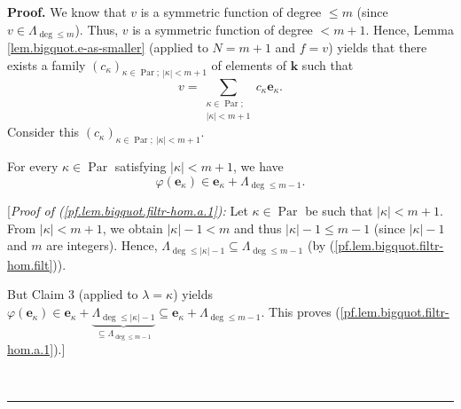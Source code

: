 \documentclass[numbers=enddot,12pt,final,onecolumn,notitlepage]{scrartcl}%
\theoremstyle{definition}
\newenvironment{proof}[1][Proof]{\noindent\textbf{#1.} }{\ \rule{0.5em}{0.5em}}
\let\sumnonlimits\sum
\renewcommand{\sum}{\sumnonlimits\limits}
\begin{document}
\begin{proof}
We know that $v$ is a symmetric function of degree $\leq m$ (since
$v\in\Lambda_{\deg\leq m}$). Thus, $v$ is a symmetric function of degree
$<m+1$. Hence, Lemma \ref{lem.bigquot.e-as-smaller} (applied to $N=m+1$ and
$f=v$) yields that there exists a family $\left(  c_{\kappa}\right)
_{\kappa\in\operatorname*{Par};\ \left\vert \kappa\right\vert <m+1}$ of
elements of $\mathbf{k}$ such that
\begin{equation}
v=\sum_{\substack{\kappa\in\operatorname*{Par};\\\left\vert \kappa\right\vert
<m+1}}c_{\kappa}\mathbf{e}_{\kappa}. \label{pf.lem.bigquot.filtr-hom.a.v=sum}%
\end{equation}
Consider this $\left(  c_{\kappa}\right)  _{\kappa\in\operatorname*{Par}%
;\ \left\vert \kappa\right\vert <m+1}$.

For every $\kappa\in\operatorname*{Par}$ satisfying $\left\vert \kappa
\right\vert <m+1$, we have%
\begin{equation}
\varphi\left(  \mathbf{e}_{\kappa}\right)  \in\mathbf{e}_{\kappa}%
+\Lambda_{\deg\leq m-1}. \label{pf.lem.bigquot.filtr-hom.a.1}%
\end{equation}


[\textit{Proof of (\ref{pf.lem.bigquot.filtr-hom.a.1}):} Let $\kappa
\in\operatorname*{Par}$ be such that $\left\vert \kappa\right\vert <m+1$. From
$\left\vert \kappa\right\vert <m+1$, we obtain $\left\vert \kappa\right\vert
-1<m$ and thus $\left\vert \kappa\right\vert -1\leq m-1$ (since $\left\vert
\kappa\right\vert -1$ and $m$ are integers). Hence, $\Lambda_{\deg
\leq\left\vert \kappa\right\vert -1}\subseteq\Lambda_{\deg\leq m-1}$ (by
(\ref{pf.lem.bigquot.filtr-hom.filt})).

But Claim 3 (applied to $\lambda=\kappa$) yields $\varphi\left(
\mathbf{e}_{\kappa}\right)  \in\mathbf{e}_{\kappa}+\underbrace{\Lambda
_{\deg\leq\left\vert \kappa\right\vert -1}}_{\subseteq\Lambda_{\deg\leq m-1}%
}\subseteq\mathbf{e}_{\kappa}+\Lambda_{\deg\leq m-1}$. This proves
(\ref{pf.lem.bigquot.filtr-hom.a.1}).]


\end{proof}
\end{document}
